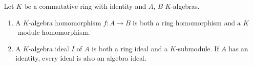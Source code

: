 Let $K$ be a commutative ring with identity and $A$, $B$ $K$-algebras.
\begin{enumerate}
\item[(i)] A $K$-algebra homomorphism $f: A \to B$ is both a ring homomorphism and a $K$-module homomorphism.
\item[(ii)] A $K$-algebra ideal $I$ of $A$ is both a ring ideal and a $K$-submodule. If $A$ has an identity, every ideal is also an algebra ideal.
\end{enumerate}
